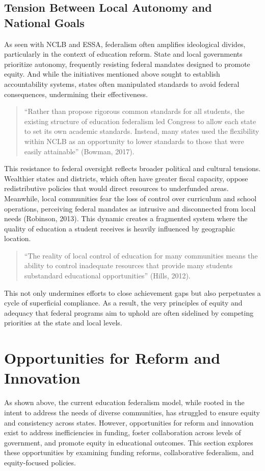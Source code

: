 \documentclass[11pt]{extarticle}
\begin{document}
\subsection{Tension Between Local Autonomy and National Goals}
As seen with NCLB and ESSA, federalism often amplifies ideological divides, particularly in the context of education reform. State and local governments prioritize autonomy, frequently resisting federal mandates designed to promote equity. And while the initiatives mentioned above sought to establish accountability systems, states often manipulated standards to avoid federal consequences, undermining their effectiveness.
\begin{quote}
  ``Rather than propose rigorous common standards for all students, the existing structure of education federalism led Congress to allow each state to set its own academic standards. Instead, many states used the flexibility within NCLB as an opportunity to lower standards to those that were easily attainable” (Bowman, 2017).
\end{quote}
This resistance to federal oversight reflects broader political and cultural tensions. Wealthier states and districts, which often have greater fiscal capacity, oppose redistributive policies that would direct resources to underfunded areas. Meanwhile, local communities fear the loss of control over curriculum and school operations, perceiving federal mandates as intrusive and disconnected from local needs (Robinson, 2013). This dynamic creates a fragmented system where the quality of education a student receives is heavily influenced by geographic location.
\begin{quote}
``The reality of local control of education for many communities means the ability to control inadequate resources that provide many students substandard educational opportunities'' (Hills, 2012).
\end{quote}
This not only undermines efforts to close achievement gaps but also perpetuates a cycle of superficial compliance. As a result, the very principles of equity and adequacy that federal programs aim to uphold are often sidelined by competing priorities at the state and local levels.








\section{Opportunities for Reform and Innovation}
As shown above, the current education federalism model, while rooted in the intent to address the needs of diverse communities, has struggled to ensure equity and consistency across states. However, opportunities for reform and innovation exist to address inefficiencies in funding, foster collaboration across levels of government, and promote equity in educational outcomes. This section explores these opportunities by examining funding reforms, collaborative federalism, and equity-focused policies.
\end{document}

